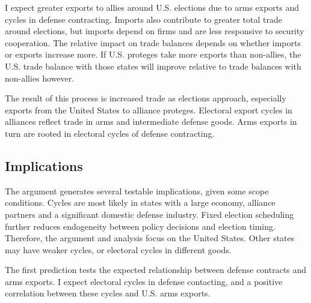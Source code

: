 \documentclass[12pt]{article}
\begin{document}


I expect greater exports to allies around U.S. elections due to arms exports and cycles in defense contracting.
Imports also contribute to greater total trade around elections, but imports depend on firms and are less responsive to security cooperation.
The relative impact on trade balances depends on whether imports or exports increase more. 
If U.S. proteges take more exports than non-allies, the U.S. trade balance with those states will improve relative to trade balances with non-allies however.


The result of this process is increased trade as elections approach, especially exports from the United States to alliance proteges.
Electoral export cycles in alliances reflect trade in arms and intermediate defense goods. 
Arms exports in turn are rooted in electoral cycles of defense contracting.



\subsection{Implications}



The argument generates several testable implications, given some scope conditions. 
Cycles are most likely in states with a large economy, alliance partners and a significant domestic defense industry. 
Fixed election scheduling further reduces endogeneity between policy decisions and election timing.
Therefore, the argument and analysis focus on the United States. 
Other states may have weaker cycles, or electoral cycles in different goods.


The first prediction tests the expected relationship between defense contracts and arms exports. 
I expect electoral cycles in defense contacting, and a positive correlation between these cycles and U.S. arms exports.
\end{document}
